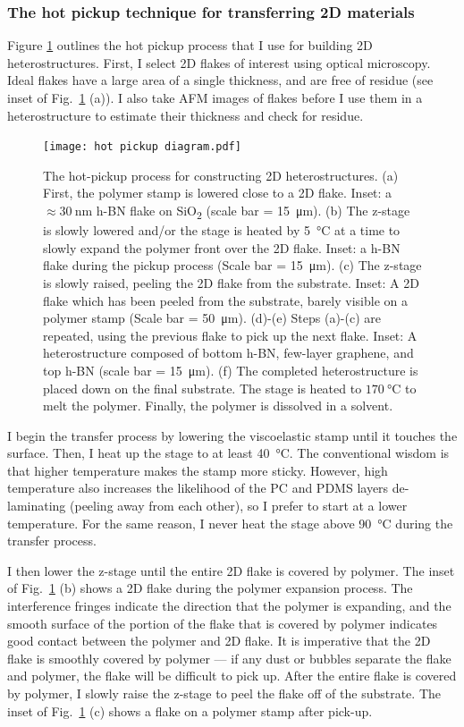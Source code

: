 \documentclass{beavtex_dub_edit}
\begin{document}
\subsubsection{The hot pickup technique for transferring 2D materials} \label{the hot pickup proces}
Figure \ref{hot pickup diagram} outlines the hot pickup process that I use for building 2D heterostructures. First, I select 2D flakes of interest using optical microscopy. Ideal flakes have a large area of a single thickness, and are free of residue (see inset of Fig.\ \ref{hot pickup diagram} (a)). I also take AFM images of flakes before I use them in a heterostructure to estimate their thickness and check for residue. 

\begin{figure}
    \texttt{[image: hot pickup diagram.pdf]}
    \caption{The hot-pickup process for constructing 2D heterostructures. (a) First, the polymer stamp is lowered close to a 2D flake. Inset: a $\approx \SI{30}{\nano\meter}$ h-BN flake on SiO\textsubscript{2} (scale bar = \SI{15}{\micro\meter}). (b) The z-stage is slowly lowered and/or the stage is heated by \SI{5}{\celsius} at a time to slowly expand the polymer front over the 2D flake. Inset: a h-BN flake during the pickup process (Scale bar = \SI{15}{\micro\meter}). (c) The z-stage is slowly raised, peeling the 2D flake from the substrate. Inset: A 2D flake which has been peeled from the substrate, barely visible on a polymer stamp (Scale bar = \SI{50}{\micro\meter}). (d)-(e) Steps (a)-(c) are repeated, using the previous flake to pick up the next flake. Inset: A heterostructure composed of bottom h-BN, few-layer graphene, and top h-BN (scale bar = \SI{15}{\micro\meter}). (f) The completed heterostructure is placed down on the final substrate. The stage is heated to $\SI{170}{\celsius}$ to melt the polymer. Finally, the polymer is dissolved in a solvent.}
    \label{hot pickup diagram}
\end{figure}

I begin the transfer process by lowering the viscoelastic stamp until it touches the surface. Then, I heat up the stage to at least \SI{40}{\celsius}. The conventional wisdom is that higher temperature makes the stamp more sticky. However, high temperature also increases the likelihood of the PC and PDMS layers de-laminating (peeling away from each other), so I prefer to start at a lower temperature. For the same reason, I never heat the stage above \SI{90}{\celsius} during the transfer process. 

I then lower the z-stage until the entire 2D flake is covered by polymer. The inset of Fig.\ \ref{hot pickup diagram} (b) shows a 2D flake during the polymer expansion process. The interference fringes indicate the direction that the polymer is expanding, and the smooth surface of the portion of the flake that is covered by polymer indicates good contact between the polymer and 2D flake. It is imperative that the 2D flake is smoothly covered by polymer — if any dust or bubbles separate the flake and polymer, the flake will be difficult to pick up. After the entire flake is covered by polymer, I slowly raise the z-stage to peel the flake off of the substrate. The inset of Fig.\ \ref{hot pickup diagram} (c) shows a flake on a polymer stamp after pick-up.
\end{document}

